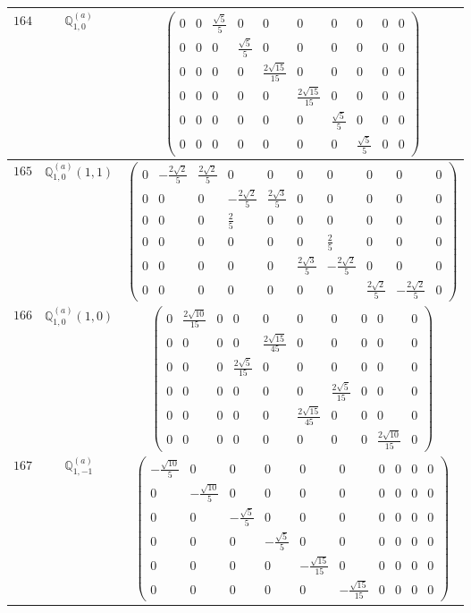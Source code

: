 \documentclass[fleqn,8pt,landscape]{jsarticle}
\begin{document}
\begin{center}
\begin{longtable}{ccc}
$ 164 $ & $ \mathbb{Q}_{1,0}^{(a)} $ & $ \begin{pmatrix} 0 & 0 & \frac{\sqrt{5}}{5} & 0 & 0 & 0 & 0 & 0 & 0 & 0 \\ 0 & 0 & 0 & \frac{\sqrt{5}}{5} & 0 & 0 & 0 & 0 & 0 & 0 \\ 0 & 0 & 0 & 0 & \frac{2 \sqrt{15}}{15} & 0 & 0 & 0 & 0 & 0 \\ 0 & 0 & 0 & 0 & 0 & \frac{2 \sqrt{15}}{15} & 0 & 0 & 0 & 0 \\ 0 & 0 & 0 & 0 & 0 & 0 & \frac{\sqrt{5}}{5} & 0 & 0 & 0 \\ 0 & 0 & 0 & 0 & 0 & 0 & 0 & \frac{\sqrt{5}}{5} & 0 & 0 \end{pmatrix} $ \\ \hline
$ 165 $ & $ \mathbb{Q}_{1,0}^{(a)}(1,1) $ & $ \begin{pmatrix} 0 & - \frac{2 \sqrt{2}}{5} & \frac{2 \sqrt{2}}{5} & 0 & 0 & 0 & 0 & 0 & 0 & 0 \\ 0 & 0 & 0 & - \frac{2 \sqrt{2}}{5} & \frac{2 \sqrt{3}}{5} & 0 & 0 & 0 & 0 & 0 \\ 0 & 0 & 0 & \frac{2}{5} & 0 & 0 & 0 & 0 & 0 & 0 \\ 0 & 0 & 0 & 0 & 0 & 0 & \frac{2}{5} & 0 & 0 & 0 \\ 0 & 0 & 0 & 0 & 0 & \frac{2 \sqrt{3}}{5} & - \frac{2 \sqrt{2}}{5} & 0 & 0 & 0 \\ 0 & 0 & 0 & 0 & 0 & 0 & 0 & \frac{2 \sqrt{2}}{5} & - \frac{2 \sqrt{2}}{5} & 0 \end{pmatrix} $ \\ \hline
$ 166 $ & $ \mathbb{Q}_{1,0}^{(a)}(1,0) $ & $ \begin{pmatrix} 0 & \frac{2 \sqrt{10}}{15} & 0 & 0 & 0 & 0 & 0 & 0 & 0 & 0 \\ 0 & 0 & 0 & 0 & \frac{2 \sqrt{15}}{45} & 0 & 0 & 0 & 0 & 0 \\ 0 & 0 & 0 & \frac{2 \sqrt{5}}{15} & 0 & 0 & 0 & 0 & 0 & 0 \\ 0 & 0 & 0 & 0 & 0 & 0 & \frac{2 \sqrt{5}}{15} & 0 & 0 & 0 \\ 0 & 0 & 0 & 0 & 0 & \frac{2 \sqrt{15}}{45} & 0 & 0 & 0 & 0 \\ 0 & 0 & 0 & 0 & 0 & 0 & 0 & 0 & \frac{2 \sqrt{10}}{15} & 0 \end{pmatrix} $ \\ \hline
$ 167 $ & $ \mathbb{Q}_{1,-1}^{(a)} $ & $ \begin{pmatrix} - \frac{\sqrt{10}}{5} & 0 & 0 & 0 & 0 & 0 & 0 & 0 & 0 & 0 \\ 0 & - \frac{\sqrt{10}}{5} & 0 & 0 & 0 & 0 & 0 & 0 & 0 & 0 \\ 0 & 0 & - \frac{\sqrt{5}}{5} & 0 & 0 & 0 & 0 & 0 & 0 & 0 \\ 0 & 0 & 0 & - \frac{\sqrt{5}}{5} & 0 & 0 & 0 & 0 & 0 & 0 \\ 0 & 0 & 0 & 0 & - \frac{\sqrt{15}}{15} & 0 & 0 & 0 & 0 & 0 \\ 0 & 0 & 0 & 0 & 0 & - \frac{\sqrt{15}}{15} & 0 & 0 & 0 & 0 \end{pmatrix} $ \\ \hline

\end{longtable}
\end{center}
\end{document}
